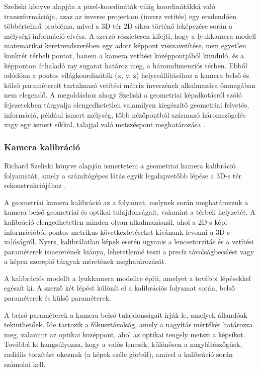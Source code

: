Szeliski könyve alapján a pixel-koordináták világ koordinátákká való
transzformációja, azaz az inverse projection (inverz vetítés) egy
eredendően többértelmű probléma, mivel a 3D tér 2D síkra történő
leképezése során a mélységi információ elvész. A szerző részletesen
kifejti, hogy a lyukkamera modell matematikai keretrendszerében egy
adott képpont visszavetítése, nem egyetlen konkrét térbeli pontot, hanem
a kamera vetítési középpontjából kiinduló, és a képponton áthaladó ray
sugarat határoz meg, a háromdimenziós térben. Ebből adódóan a pontos
világkoordináták (x, y, z) helyreállításához a kamera belső és külső
paramétereit tartalmazó vetítési mátrix inverzének alkalmazása önmagában
nem elegendő. A megoldáshoz ahogy Szeliski a geometriai képalkotásról
szóló fejezetekben tárgyalja elengedhetetlen valamilyen kiegészítő
geometriai felvetés, információ, például ismert mélység, több
nézőpontból származó háromszögelés vagy egy ismert síkkal, talajjal való
metszéspont meghatározása \cite{szeliskiComputerVisionAlgorithms2011}.

\subsubsection*{Kamera kalibráció}

Richard Szeliski könyve alapján ismertetem a geometriai kamera
kalibráció folyamatát, amely a számítógépes látás egyik legalapvetőbb
lépése a 3D-s tér rekonstrukciójához \cite{szeliskiComputerVisionAlgorithms2011}.

A geometriai kamera kalibráció az a folyamat, melynek során
meghatározzuk a kamera belső geometriai és optikai tulajdonságait,
valamint a térbeli helyzetét. A kalibráció elengedhetetlen minden olyan
alkalmazásnál, ahol a 2D-s képi információból pontos metrikus
következtetéseket kívánunk levonni a 3D-s valóságról. Nyers,
kalibrálatlan képek esetén ugyanis a lencsetorzítás és a vetítési
paraméterek ismeretének hiánya, lehetetlenné teszi a precíz
távolságbecslést vagy a képen szereplő tárgyak méretének meghatározását.

A kalibrációs modellt a lyukkamera modellre építi, amelyet a további
lépésekkel egészít ki. A szerző két lépést különít el a kalibrációs
folyamat során, belső paraméterek és külső paraméterek.

A belső paraméterek a kamera belső tulajdonságait írják le, amelyek
állandóak tekinthetőek. Ide tartozik a fókusztávolság, amely a nagyítás
mértékét határozza meg, valamint az optikai középpont, ahol az optikai
tengely metszi a képsíkot. Továbbá ki hangsúlyozza, hogy a valós
lencsék, különösen a nagylátószögűek, radiális torzítást okoznak (a
képek széle görbül), amivel a kalibráció során számolni kell.

